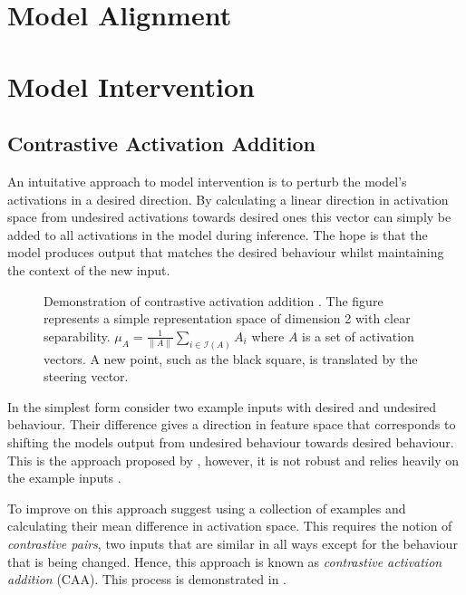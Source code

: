 \section{Model Alignment}

\section{Model Intervention}

\subsection{Contrastive Activation Addition}
\label{caa}

An intuitative approach to model intervention is to perturb the model's activations in a desired direction.
By calculating a linear direction in activation space from undesired activations towards desired ones this vector can simply be added to all activations in the model during inference.
The hope is that the model produces output that matches the desired behaviour whilst maintaining the context of the new input.

\begin{figure}
    \centering
    \captionsetup{width=.9\textwidth}
    
\caption{Demonstration of contrastive activation addition \citep{caa}. The figure represents a simple representation space of dimension 2 with clear separability. $\mu_A = \frac{1}{\|A\|}\sum_{i \in \mathcal{I}(A)} A_i$ where $A$ is a set of activation vectors. A new point, such as the black square, is translated by the steering vector.}
    \label{fig:caa}
\end{figure}

In the simplest form consider two example inputs with desired and undesired behaviour.
Their difference gives a direction in feature space that corresponds to shifting the models output from undesired behaviour towards desired behaviour.
This is the approach proposed by \citet{activation-addition}, however, it is not robust and relies heavily on the example inputs \citep{caa}.

To improve on this approach \citet{caa} suggest using a collection of examples and calculating their mean difference in activation space.
This requires the notion of \textit{contrastive pairs}, two inputs that are similar in all ways except for the behaviour that is being changed.
Hence, this approach is known as \textit{contrastive activation addition} (CAA).
This process is demonstrated in .

